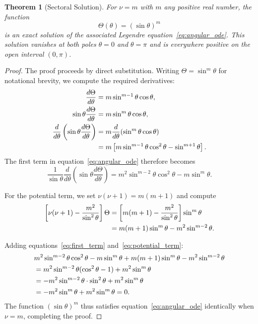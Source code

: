 \documentclass[10pt,a4paper]{amsart}
\newtheorem{theorem}{Theorem}
\begin{document}
\begin{theorem}[Sectoral Solution]
\label{thm:sectoral}
For $\nu = m$ with $m$ any positive real number, the function
\begin{equation}
\Theta(\theta) = (\sin\theta)^m
\label{eq:sectoral_solution}
\end{equation}
is an exact solution of the associated Legendre equation~\eqref{eq:angular_ode}. This solution vanishes at both poles $\theta = 0$ and $\theta = \pi$ and is everywhere positive on the open interval $(0, \pi)$.
\end{theorem}

\begin{proof}
The proof proceeds by direct substitution. Writing $\Theta = \sin^m\theta$ for notational brevity, we compute the required derivatives:
\begin{align}
\frac{d\Theta}{d\theta} &= m\sin^{m-1}\theta\cos\theta, \\
\sin\theta\frac{d\Theta}{d\theta} &= m\sin^m\theta\cos\theta, \\
\frac{d}{d\theta}\left(\sin\theta\frac{d\Theta}{d\theta}\right) &= m\frac{d}{d\theta}(\sin^m\theta\cos\theta) \notag \\
&= m\left[m\sin^{m-1}\theta\cos^2\theta - \sin^{m+1}\theta\right].
\end{align}
The first term in equation~\eqref{eq:angular_ode} therefore becomes
\begin{equation}
\frac{1}{\sin\theta}\frac{d}{d\theta}\left(\sin\theta\frac{d\Theta}{d\theta}\right) = m^2\sin^{m-2}\theta\cos^2\theta - m\sin^m\theta.
\label{eq:first_term}
\end{equation}

For the potential term, we set $\nu(\nu+1) = m(m+1)$ and compute
\begin{align}
\left[\nu(\nu+1) - \frac{m^2}{\sin^2\theta}\right]\Theta &= \left[m(m+1) - \frac{m^2}{\sin^2\theta}\right]\sin^m\theta \notag \\
&= m(m+1)\sin^m\theta - m^2\sin^{m-2}\theta.
\label{eq:potential_term}
\end{align}

Adding equations~\eqref{eq:first_term} and~\eqref{eq:potential_term}:
\begin{align}
&m^2\sin^{m-2}\theta\cos^2\theta - m\sin^m\theta + m(m+1)\sin^m\theta - m^2\sin^{m-2}\theta \notag \\
&= m^2\sin^{m-2}\theta(\cos^2\theta - 1) + m^2\sin^m\theta \notag \\
&= -m^2\sin^{m-2}\theta \cdot \sin^2\theta + m^2\sin^m\theta \notag \\
&= -m^2\sin^m\theta + m^2\sin^m\theta = 0.
\end{align}
The function $(\sin\theta)^m$ thus satisfies equation~\eqref{eq:angular_ode} identically when $\nu = m$, completing the proof.
\end{proof}
\end{document}
